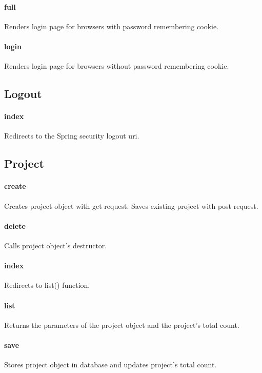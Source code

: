 \documentclass[12pt]{article}
\begin{document}
\paragraph{full} Renders login page for browsers with password remembering cookie.
\paragraph{login} Renders login page for browsers without password remembering cookie.

\subsection{Logout}\label{sec:CLogout}
\paragraph{index} Redirects to the Spring security logout uri.

\subsection{Project}\label{sec:CProject}
\paragraph{create} Creates project object with get request. Saves existing project with post request.
\paragraph{delete} Calls project object's destructor.
\paragraph{index} Redirects to list() function.
\paragraph{list} Returns the parameters of the project object and the project's total count.
\paragraph{save} Stores project object in database and updates project's total count.
\end{document}
